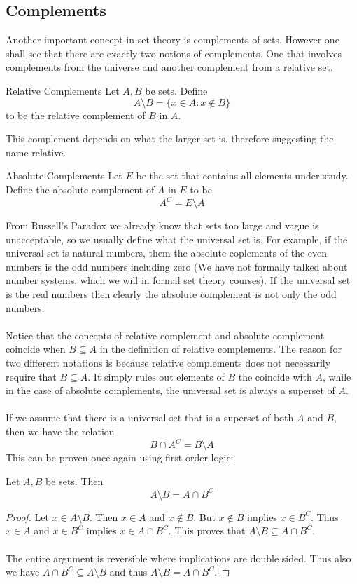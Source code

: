 \documentclass[a4paper]{article}
\begin{document}
\subsection{Complements}
Another important concept in set theory is complements of sets. However one shall see that there are exactly two notions of complements. One that involves complements from the universe and another complement from a relative set. 

\begin{defn}{Relative Complements}{} Let $A,B$ be sets. Define $$A\setminus B=\{x\in A:x\notin B\}$$ to be the relative complement of $B$ in $A$. 
\end{defn}

This complement depends on what the larger set is, therefore suggesting the name relative. 

\begin{defn}{Absolute Complements}{} Let $E$ be the set that contains all elements under study. Define the absolute complement of $A$ in $E$ to be $$A^C=E\setminus A$$
\end{defn}

From Russell's Paradox we already know that sets too large and vague is unacceptable, so we usually define what the universal set is. For example, if the universal set is natural numbers, them the absolute coplements of the even numbers is the odd numbers including zero (We have not formally talked about number systems, which we will in formal set theory courses). If the universal set is the real numbers then clearly the absolute complement is not only the odd numbers. \\~\\

Notice that the concepts of relative complement and absolute complement coincide when $B\subseteq A$ in the definition of relative complements. The reason for two different notations is because relative complements does not necessarily require that $B\subseteq A$. It simply rules out elements of $B$ the coincide with $A$, while in the case of absolute complements, the universal set is always a superset of $A$. \\~\\

If we assume that there is a universal set that is a superset of both $A$ and $B$, then we have the relation $$B\cap A^C=B\setminus A$$ This can be proven once again using first order logic:

\begin{prp}{}{} Let $A,B$ be sets. Then $$A\setminus B=A\cap B^C$$\tcbline
\begin{proof} Let $x\in A\setminus B$. Then $x\in A$ and $x\notin B$. But $x\notin B$ implies $x\in B^C$. Thus $x\in A$ and $x\in B^C$ implies $x\in A\cap B^C$. This proves that $A\setminus B\subseteq A\cap B^C$. \\~\\
The entire argument is reversible where implications are double sided. Thus also we have $A\cap B^C\subseteq A\setminus B$ and thus $A\setminus B=A\cap B^C$. 
\end{proof}
\end{prp}
\end{document}
